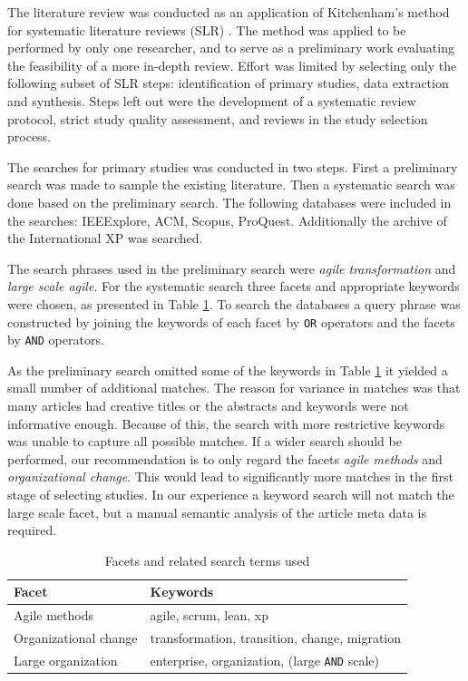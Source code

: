 \documentclass[lnbip]{svmultln}
\begin{document}
%
%
%


The literature review was conducted as an application of Kitchenham's
method for systematic literature reviews (SLR) . The method
was applied to be performed by only one researcher, and to serve as a
preliminary work evaluating the feasibility of a more in-depth review.
Effort was limited by selecting only the following subset of SLR steps:
identification of primary studies, data extraction and synthesis. Steps left out
were the development of a systematic review protocol, strict study quality
assessment, and reviews in the study selection process.

The searches for primary studies was conducted in two steps. First a preliminary
search was made to sample the existing literature. Then a systematic search was
done based on the preliminary search. The following databases were included in
the searches: IEEExplore, ACM, Scopus, ProQuest. Additionally the archive of the
International XP was searched.

The search phrases used in the preliminary search were \textit{agile
transformation} and \textit{large scale agile}. For the systematic search three
facets and appropriate keywords were chosen, as presented in Table
\ref{table:searchterms}. To search the databases a query phrase was constructed
by joining the keywords of each facet by \texttt{OR} operators and the facets by
\texttt{AND} operators.

As the preliminary search omitted some of the keywords in Table
\ref{table:searchterms} it yielded a small number of additional matches. The
reason for variance in matches was that many articles had creative titles or the
abstracts and keywords were not informative enough. Because of this, the search
with more restrictive keywords was unable to capture all possible matches.
If a wider search should be performed, our recommendation is to only regard the
facets \textit{agile methods} and \textit{organizational change}. This would
lead to significantly more matches in the first stage of selecting studies.
In our experience a keyword search will not match the large scale facet, but a
manual semantic analysis of the article meta data is required.

\begin{table}[t]
    \begin{tabular}{ l@{ \hskip 0.4cm } l }
        \toprule
        Facet                  & Keywords   \\ \midrule
        Agile methods          & agile, scrum, lean, xp \\ 
        Organizational change  & transformation, transition, change, migration \\
        Large organization     & enterprise, organization, (large \texttt{AND} scale) \\
        \bottomrule
    \end{tabular}
    \caption{Facets and related search terms used}
    \label{table:searchterms}
\end{table}
\end{document}

